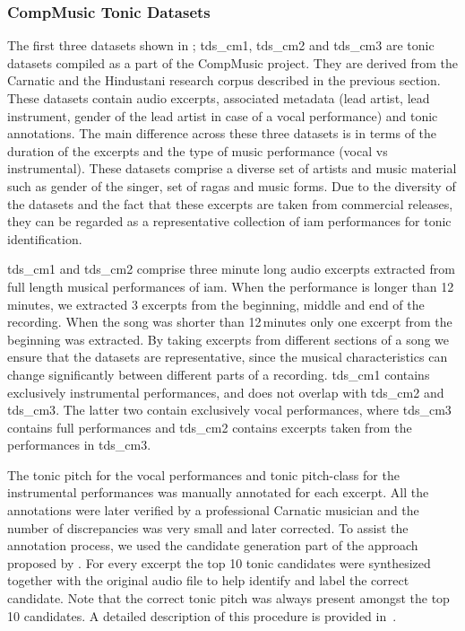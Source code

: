{\subsubsection{CompMusic Tonic Datasets}
\label{sec:corpus_compmusic_tonic_dataset}

The first three datasets shown in ; \acrshort{tds_cm1}, \acrshort{tds_cm2} and \acrshort{tds_cm3} are tonic datasets compiled as a part of the CompMusic project. They are derived from the Carnatic and the Hindustani research corpus described in the previous section. These datasets contain audio excerpts, associated metadata (lead artist, lead instrument, gender of the lead artist in case of a vocal performance) and tonic annotations. The main difference across these three datasets is in terms of the duration of the excerpts and the type of music performance (vocal vs instrumental). These datasets comprise a diverse set of artists and music material such as gender of the singer, set of \glspl{raga} and music forms. Due to the diversity of the datasets and the fact that these excerpts are taken from commercial releases, they can be regarded as a representative collection of \gls{iam} performances for tonic identification.  

\acrshort{tds_cm1} and \acrshort{tds_cm2} comprise three minute long audio excerpts extracted from full length musical performances of \gls{iam}. When the performance is longer than 12\,minutes, we extracted 3 excerpts from the beginning, middle and end of the recording. When the song was shorter than 12\,minutes only one excerpt from the beginning was extracted. By taking excerpts from different sections of a song we ensure that the datasets are representative, since the musical characteristics can change significantly between different parts of a recording. \acrshort{tds_cm1} contains exclusively instrumental performances, and does not overlap with \acrshort{tds_cm2} and \acrshort{tds_cm3}. The latter two contain exclusively vocal performances, where \acrshort{tds_cm3} contains full performances and \acrshort{tds_cm2} contains excerpts taken from the performances in \acrshort{tds_cm3}. 

The tonic pitch for the vocal performances and tonic pitch-class for the instrumental performances was manually annotated for each excerpt. All the annotations were later verified by a professional Carnatic musician and the number of discrepancies was very small and later corrected. To assist the annotation process, we used the candidate generation part of the approach proposed by \cite{Salamon2012}. For every excerpt the top 10 tonic candidates were synthesized together with the original audio file to help identify and label the correct candidate. Note that the correct tonic pitch was always present amongst the top 10 candidates. A detailed description of this procedure is provided in~\cite{SGulati_MThesis2012}.


}
